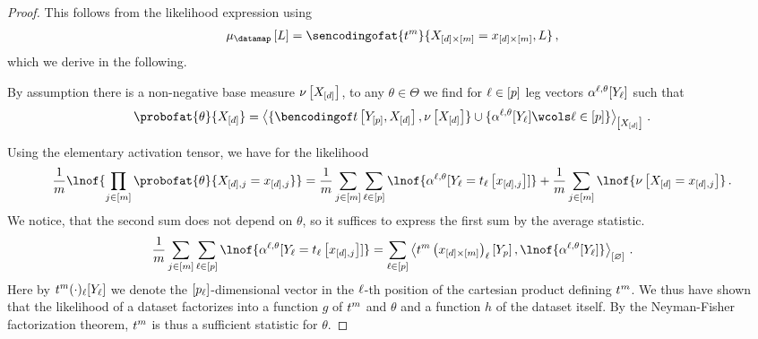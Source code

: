 \documentclass[aps,onecolumn,nofootinbib,pra]{article}
\begin{document}
    \begin{proof}
        This follows from the likelihood expression using
        \begin{align*}
            \datameanat{\selvariable} = \sencodingofat{\sstat^{\datanum}}{\indexedcatvariableof{[\catorder]\times[\datanum]},\selvariable} \, ,
        \end{align*}
        which we derive in the following.

        By assumption there is a non-negative base measure $\nu\left[X_{[d]}\right]$, to any $\theta\in\Theta$ we find for $\ell\in[p]$ leg vectors $\alpha^{\ell,\theta}[Y_{\ell}]$ such that
        \begin{align*}
            \probofat{\theta}{\shortcatvariables}
            = \contractionof{\{\bencsstatwith,\basemeasurewith\}\cup\{\actcoreofat{\selindex,\theta}{\headvariableof{\selindex}}\wcols\selindexin\}}{\shortcatvariables} \, .
        \end{align*}

        Using the elementary activation tensor, we have for the likelihood
        \begin{align*}
            \frac{1}{\datanum}\lnof{\prod_{\datindexin}\probofat{\theta}{\indexedcatvariableof{[\catorder],\datindex}}}
            = \frac{1}{\datanum}\sum_{\datindexin}\sum_{\selindexin} \lnof{\actcoreofat{\selindex,\theta}{\headvariableof{\selindex}=\sstatcoordinateofat{\selindex}{\catindexof{[\catorder],\datindex}}}}
            + \frac{1}{\datanum}\sum_{\datindexin} \lnof{\basemeasureat{\shortcatvariables=\catindexof{[\catorder],\datindex}}} \, .
        \end{align*}
        We notice, that the second sum does not depend on $\theta$, so it suffices to express the first sum by the average statistic.
        \begin{align*}
            \frac{1}{\datanum}\sum_{\datindexin}\sum_{\selindexin} \lnof{\actcoreofat{\selindex,\theta}{\headvariableof{\selindex}=\sstatcoordinateofat{\selindex}{\catindexof{[\catorder],\datindex}}}}
            = \sum_{\selindexin}
            \contraction{
                \sstat^{\datanum}\left(\catindexof{[\catorder]\times[\datanum]}\right)_{\selindex}\left[\headvariableof{\seldim}\right],\lnof{\actcoreofat{\selindex,\theta}{\headvariableof{\selindex}}}
            } \, .
        \end{align*}
        Here by $t^{m}(\cdot)_{\ell}[Y_{\ell}]$ we denote the $[p_{\ell}]$-dimensional vector in the $\ell$-th position of the cartesian product defining $t^{m}$.
        We thus have shown that the likelihood of a dataset factorizes into a function $g$ of $t^{m}$ and $\theta$ and a function $h$ of the dataset itself.
        By the Neyman-Fisher factorization theorem, $t^{m}$ is thus a sufficient statistic for $\theta$.
    \end{proof}
\end{document}
